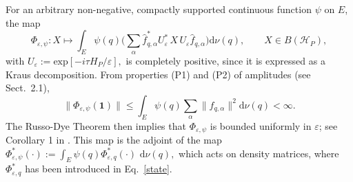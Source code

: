 \documentclass[12pt]{article}
\newcommand{\id}{\mathbf{1}}
\begin{document}
For an arbitrary non-negative, compactly supported continuous function $\psi$ on $E$, the map
$$\Phi_{\varepsilon, \psi}: X \mapsto \int_{E} \psi(q) \Big(\sum_{\alpha} \widehat{f}_{q,\alpha}^{*} U_{\varepsilon}^{*}\, X\, U_{\varepsilon} \widehat{f}_{q, \alpha}\Big) \text{d}\nu(q), \qquad X\in B(\mathcal{H}_P),$$
with $U_{\varepsilon}:= \text{exp}[-i\tau H_{P}/\varepsilon],$ is completely positive, since it is expressed as
a Kraus decomposition. From properties (P1) and (P2) of amplitudes (see Sect.~2.1), 
$$\|\Phi_{\varepsilon,\psi}(\id)\|\leq \int_E\psi(q)\sum_\alpha\|f_{q,\alpha}\|^2\mathrm{d}\nu(q)<\infty.$$
The Russo-Dye Theorem then implies that $\Phi_{\varepsilon,\psi}$ is bounded uniformly in $\varepsilon$;
see Corollary 1 in \cite{RD}. This map is the adjoint of the map 
$\Phi_{\varepsilon, \psi}^{*}(\cdot):=\int_{E}\psi(q) \Phi_{\varepsilon, q}^{*}(\cdot)\text{ d}\nu(q),$ which acts on density matrices,
where $\Phi_{\varepsilon,q}^{*}$ has been introduced in Eq.~\eqref{state}.
\end{document}
